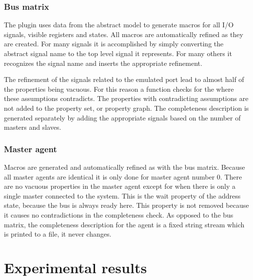 \subsubsection{Bus matrix}
The plugin uses data from the abstract model to generate macros for all I/O signals, visible registers and states. All macros are automatically refined as they are created. For many signals it is accomplished by simply converting the abstract signal name to the top level signal it represents. For many others it recognizes the signal name and inserts the appropriate refinement. \par
The refinement of the signals related to the emulated port lead to almost half of the properties being vacuous. For this reason a function checks for the where these assumptions contradicts. The properties with contradicting assumptions are not added to the property set, or property graph. The completeness description is generated separately by adding the appropriate signals based on the number of masters and slaves.

\subsubsection{Master agent}
Macros are generated and automatically refined as with the bus matrix. Because all master agents are identical it is only done for master agent number 0. There are no vacuous properties in the master agent except for when there is only a single master connected to the system. This is the wait property of the address state, because the bus is always ready here. This property is not removed because it causes no contradictions in the completeness check. As opposed to the bus matrix, the completeness description for the agent is a fixed string stream which is printed to a file, it never changes. 



\section{Experimental results}
\label{sec:results}






